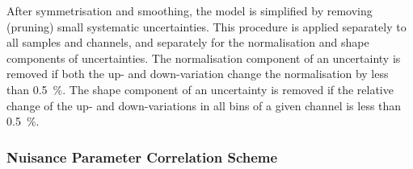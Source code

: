 

After symmetrisation and smoothing, the model is simplified by removing
(pruning) small systematic uncertainties. This procedure is applied separately
to all samples and channels, and separately for the normalisation and shape
components of uncertainties. The normalisation component of an uncertainty is
removed if both the up- and down-variation change the normalisation by less than
\SI{0.5}{\percent}. The shape component of an uncertainty is removed if the
relative change of the up- and down-variations in all bins of a given channel is
less than \SI{0.5}{\percent}.


\subsubsection{Nuisance Parameter Correlation Scheme}

